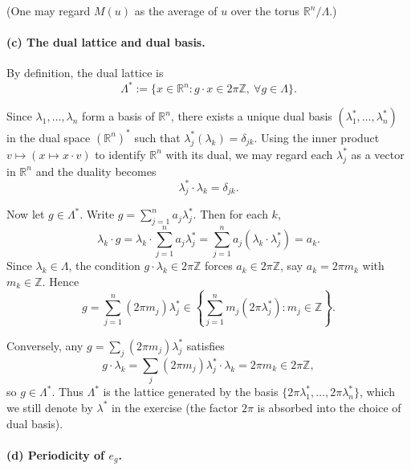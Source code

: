 \documentclass[12pt,a4paper]{article}
\theoremstyle{plain}
\theoremstyle{definition}
\theoremstyle{remark}
\theoremstyle{remark}
\begin{document}
	(One may regard $M(u)$ as the average of $u$ over the torus
	$\mathbb{R}^n/\Lambda$.)
	
	\bigskip
	
	
	\paragraph{(c) The dual lattice and dual basis.}
	
	By definition, the dual lattice is
	\[
	\Lambda^*
	:= \{x\in\mathbb{R}^n : g\cdot x\in 2\pi\mathbb{Z},
	\ \forall g\in\Lambda\}.
	\]
	
	Since $\lambda_1,\dots,\lambda_n$ form a basis of $\mathbb{R}^n$, there
	exists a unique dual basis $(\lambda_1^*,\dots,\lambda_n^*)$ in the
	dual space $(\mathbb{R}^n)^*$ such that
	$\lambda_j^*(\lambda_k) = \delta_{jk}$.  Using the inner product
	$v\mapsto (x\mapsto x\cdot v)$ to identify $\mathbb{R}^n$ with its dual,
	we may regard each $\lambda_j^*$ as a vector in $\mathbb{R}^n$ and the
	duality becomes
	\[
	\lambda_j^*\cdot\lambda_k = \delta_{jk}.
	\]
	
	Now let $g\in\Lambda^*$.  Write $g=\sum_{j=1}^n a_j\lambda_j^*$.
	Then for each $k$,
	\[
	\lambda_k\cdot g
	= \lambda_k\cdot\sum_{j=1}^n a_j\lambda_j^*
	= \sum_{j=1}^n a_j(\lambda_k\cdot\lambda_j^*)
	= a_k.
	\]
	Since $\lambda_k\in\Lambda$, the condition $g\cdot\lambda_k\in 2\pi\mathbb{Z}$
	forces $a_k\in 2\pi\mathbb{Z}$, say $a_k=2\pi m_k$ with $m_k\in\mathbb{Z}$.
	Hence
	\[
	g = \sum_{j=1}^n (2\pi m_j)\lambda_j^* \in
	\left\{\sum_{j=1}^n m_j (2\pi\lambda_j^*):m_j\in\mathbb{Z}\right\}.
	\]
	
	Conversely, any $g=\sum_j (2\pi m_j)\lambda_j^*$ satisfies
	\[
	g\cdot\lambda_k
	= \sum_j (2\pi m_j)\lambda_j^*\cdot\lambda_k
	= 2\pi m_k\in 2\pi\mathbb{Z},
	\]
	so $g\in\Lambda^*$.  Thus $\Lambda^*$ is the lattice generated by the
	basis $\{2\pi\lambda_1^*,\dots,2\pi\lambda_n^*\}$, which we still
	denote by $\lambda^*$ in the exercise (the factor $2\pi$ is absorbed
	into the choice of dual basis).
	
	\bigskip
	
	
	\paragraph{(d) Periodicity of $e_g$.}
	
\end{document}
